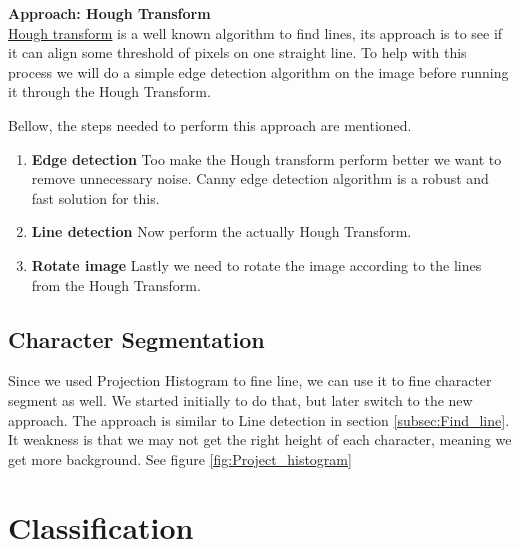 \documentclass[Report.tex]{subfiles}
\begin{document}
\begin{flushleft}
  \textbf{Approach: Hough Transform} \\
  \href{https://en.wikipedia.org/wiki/Hough_transform}{Hough transform} is a well known algorithm to find lines, its approach is to see if it can align some threshold of pixels on one straight line. To help with this process we will do a simple edge detection algorithm on the image before running it through the Hough Transform. \par Bellow, the steps needed to perform this approach are mentioned.

  \begin{enumerate}
    \item \textbf{Edge detection}
    Too make the Hough transform perform better we want to remove unnecessary noise. Canny edge detection algorithm is a robust and fast solution for this.
    \item \textbf{Line detection}
    Now perform the actually Hough Transform.
    \item \textbf{Rotate image}
    Lastly we need to rotate the image according to the lines from the Hough Transform.
  \end{enumerate}
\end{flushleft}

\subsection{Character Segmentation}
Since we used Projection Histogram to fine line, we can use it to fine character segment as well. We started initially to do that, but later switch to the new approach. The approach is similar to Line detection in section \ref{subsec:Find_line}. It weakness is that we may not get the right height of each character, meaning we get more background. See figure \ref{fig:Project_histogram}
  

\section{Classification}
\label{sec:Discarded Method:Classification}
\end{document}
